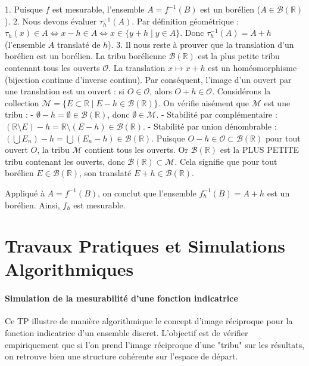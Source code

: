 \documentclass[11pt,a4paper]{article}
\begin{document}
1. Puisque $f$ est mesurable, l'ensemble $A = f^{-1}(B)$ est un borélien ($A \in \mathcal{B}(\mathbb{R})$).
2. Nous devons évaluer $\tau_h^{-1}(A)$.
   Par définition géométrique : $\tau_h(x) \in A \iff x - h \in A \iff x \in \{y + h \mid y \in A\}$.
   Donc $\tau_h^{-1}(A) = A + h$ (l'ensemble $A$ translaté de $h$).
3. Il nous reste à prouver que la translation d'un borélien est un borélien.
   La tribu borélienne $\mathcal{B}(\mathbb{R})$ est la plus petite tribu contenant tous les ouverts $\mathcal{O}$.
   La translation $x \mapsto x + h$ est un homéomorphisme (bijection continue d'inverse continu). Par conséquent, l'image d'un ouvert par une translation est un ouvert : si $O \in \mathcal{O}$, alors $O+h \in \mathcal{O}$.
   Considérons la collection $\mathcal{M} = \{E \subset \mathbb{R} \mid E-h \in \mathcal{B}(\mathbb{R})\}$.
   On vérifie aisément que $\mathcal{M}$ est une tribu :
   - $\emptyset - h = \emptyset \in \mathcal{B}(\mathbb{R})$, donc $\emptyset \in \mathcal{M}$.
   - Stabilité par complémentaire : $(\mathbb{R} \setminus E) - h = \mathbb{R} \setminus (E-h) \in \mathcal{B}(\mathbb{R})$.
   - Stabilité par union dénombrable : $(\bigcup E_n) - h = \bigcup (E_n - h) \in \mathcal{B}(\mathbb{R})$.
   Puisque $O-h \in \mathcal{O} \subset \mathcal{B}(\mathbb{R})$ pour tout ouvert $O$, la tribu $\mathcal{M}$ contient tous les ouverts.
   Or $\mathcal{B}(\mathbb{R})$ est la PLUS PETITE tribu contenant les ouverts, donc $\mathcal{B}(\mathbb{R}) \subset \mathcal{M}$.
   Cela signifie que pour tout borélien $E \in \mathcal{B}(\mathbb{R})$, son translaté $E+h \in \mathcal{B}(\mathbb{R})$.

Appliqué à $A = f^{-1}(B)$, on conclut que l'ensemble $f_h^{-1}(B) = A + h$ est un borélien.
Ainsi, $f_h$ est mesurable.


\vspace{0.5cm}



\newpage
\part{Travaux Pratiques et Simulations Algorithmiques}
\subsection*{Simulation de la mesurabilité d'une fonction indicatrice}

Ce TP illustre de manière algorithmique le concept d'image réciproque pour la fonction indicatrice d'un ensemble discret. L'objectif est de vérifier empiriquement que si l'on prend l'image réciproque d'une "tribu" sur les résultats, on retrouve bien une structure cohérente sur l'espace de départ.
\end{document}
